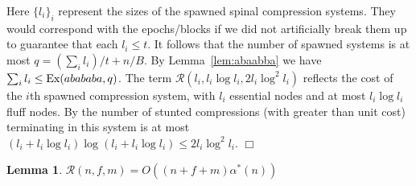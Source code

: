 \documentclass{article}
\newenvironment{proof}{\noindent {\bf Proof:}}{\hfill$\Box$}
\newtheorem{lemma}[theorem]{Lemma}
\newcommand{\Ex}{\mbox{\rm Ex}}
\newcommand{\Rec}{\mathscr{R}}
\begin{document}
\begin{proof}
Here $\{l_i\}_i$ represent the sizes of the spawned spinal compression systems.  They would 
correspond with the epochs/blocks if we did not artificially break them up to guarantee that each $l_i \le t$.
It follows that the number of spawned systems is at most $q = (\sum_i l_i)/t + n/B$.  By Lemma~\ref{lem:abaabba}
we have $\sum_i l_i \le \Ex(abababa,q)$.  The term $\Rec(l_i, l_i\log l_i, 2l_i\log^2 l_i)$ reflects the cost of the $i$th spawned compression system,
with $l_i$ essential nodes and at most $l_i\log l_i$ fluff nodes.  By \cite{Sundar92} the number of stunted compressions (with greater than unit cost)
terminating in this system is at most $(l_i + l_i\log l_i)\log(l_i + l_i\log l_i) \le 2l_i\log^2 l_i$.
\end{proof}

\begin{lemma}\label{lem:alphastar}
$\Rec(n,f,m) = O((n+f+m)\alpha^*(n))$
\end{lemma}
\end{document}
